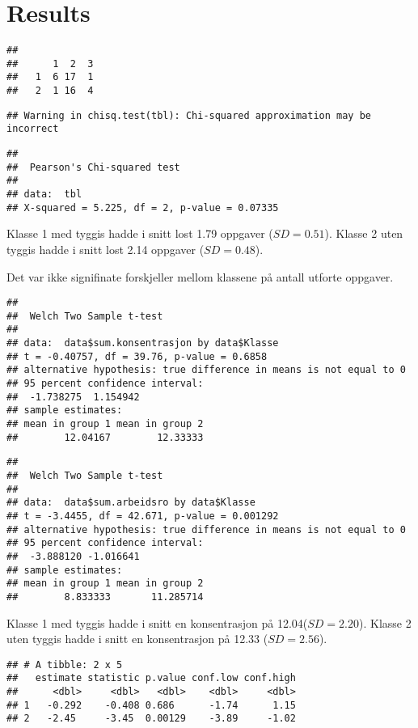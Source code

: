 \documentclass[english,jou]{apa6}
\begin{document}
\hypertarget{results}{%
\section{Results}\label{results}}

\begin{verbatim}
##    
##      1  2  3
##   1  6 17  1
##   2  1 16  4
\end{verbatim}

\begin{verbatim}
## Warning in chisq.test(tbl): Chi-squared approximation may be incorrect
\end{verbatim}

\begin{verbatim}
## 
##  Pearson's Chi-squared test
## 
## data:  tbl
## X-squared = 5.225, df = 2, p-value = 0.07335
\end{verbatim}

Klasse 1 med tyggis hadde i snitt lost 1.79 oppgaver (\(SD = 0.51\)). Klasse 2 uten tyggis hadde i snitt lost 2.14 oppgaver (\(SD = 0.48\)).

Det var ikke signifinate forskjeller mellom klassene på antall utforte oppgaver.

\begin{verbatim}
## 
##  Welch Two Sample t-test
## 
## data:  data$sum.konsentrasjon by data$Klasse
## t = -0.40757, df = 39.76, p-value = 0.6858
## alternative hypothesis: true difference in means is not equal to 0
## 95 percent confidence interval:
##  -1.738275  1.154942
## sample estimates:
## mean in group 1 mean in group 2 
##        12.04167        12.33333
\end{verbatim}

\begin{verbatim}
## 
##  Welch Two Sample t-test
## 
## data:  data$sum.arbeidsro by data$Klasse
## t = -3.4455, df = 42.671, p-value = 0.001292
## alternative hypothesis: true difference in means is not equal to 0
## 95 percent confidence interval:
##  -3.888120 -1.016641
## sample estimates:
## mean in group 1 mean in group 2 
##        8.833333       11.285714
\end{verbatim}

Klasse 1 med tyggis hadde i snitt en konsentrasjon på 12.04(\(SD = 2.20\)). Klasse 2 uten tyggis hadde i snitt en konsentrasjon på 12.33 (\(SD = 2.56\)).

\begin{verbatim}
## # A tibble: 2 x 5
##   estimate statistic p.value conf.low conf.high
##      <dbl>     <dbl>   <dbl>    <dbl>     <dbl>
## 1   -0.292    -0.408 0.686      -1.74      1.15
## 2   -2.45     -3.45  0.00129    -3.89     -1.02
\end{verbatim}
\end{document}
